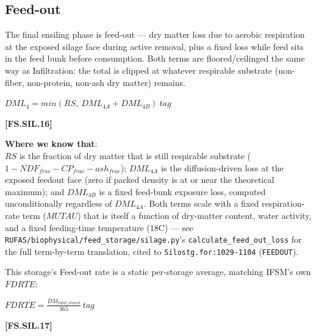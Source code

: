 \begin{refsection}
\subsection{Feed-out}
The final ensiling phase is feed-out — dry matter loss due to aerobic respiration at the exposed
silage face during active removal, plus a fixed loss while feed sits in the feed bunk before
consumption. Both terms are floored/ceilinged the same way as Infiltration: the total is clipped at
whatever respirable substrate (non-fiber, non-protein, non-ash dry matter) remains.
\vspace{0.2cm}

        \begin{center}
        \(DML_{4} = min(RS,\ DML_{4A} + DML_{4B})\ tag\)
    \end{center}
        \vspace{0.5cm}

            {\raggedleft \textbf{[FS.SIL.16]}\par}
        \vspace{0.5cm}

\textbf{Where we know that}: \\ \(RS\) is the fraction of dry matter that is still respirable
substrate (\(1 - NDF_{frac} - CP_{frac} - ash_{frac}\)); \(DML_{4A}\) is the diffusion-driven loss at
the exposed feedout face (zero if packed density is at or near the theoretical maximum); and
\(DML_{4B}\) is a fixed feed-bunk exposure loss, computed unconditionally regardless of \(DML_{4A}\).
Both terms scale with a fixed respiration-rate term (\(MUTAU\)) that is itself a function of dry-matter
content, water activity, and a fixed feeding-time temperature (18\textdegree C) — see
\texttt{RUFAS/biophysical/feed\_storage/silage.py}'s \texttt{calculate\_feed\_out\_loss} for the full
term-by-term translation, cited to \texttt{Silostg.for:1029-1104} (\texttt{FEEDOUT}).
\vspace{0.2cm}

This storage's Feed-out rate is a static per-storage average, matching IFSM's own \(FDRTE\):
\vspace{0.2cm}

        \begin{center}
        \(FDRTE = \frac{DM_{total\_stored}}{365}\ tag\)
    \end{center}
        \vspace{0.5cm}

            {\raggedleft \textbf{[FS.SIL.17]}\par}
        \vspace{0.5cm}


\end{refsection}
